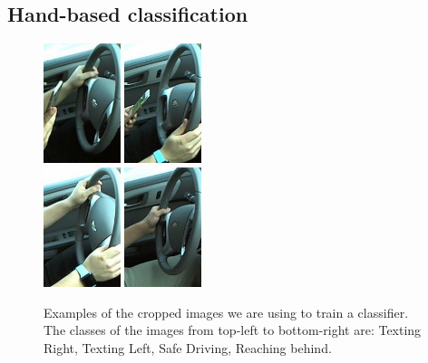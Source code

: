 \documentclass[10pt,twocolumn,letterpaper]{article}
\begin{document}
\subsection{Hand-based classification}
\begin{figure}[h]
	\centering
	\includegraphics[width=0.2\textwidth]{handpose_example_1_cut}\hspace{0.01\textwidth}
	\includegraphics[width=0.2\textwidth]{handpose_example_2_cut}\\ \vspace{0.01\textwidth}
	\includegraphics[width=0.2\textwidth]{handpose_example_3_cut}\hspace{0.01\textwidth}
	\includegraphics[width=0.2\textwidth]{handpose_example_4_cut}
	\caption{Examples of the cropped images we are using to train a classifier. The classes of the images from top-left to bottom-right are: Texting Right, Texting Left, Safe Driving, Reaching behind.}
	\label{hand_estimation_example}
\end{figure}
\end{document}
